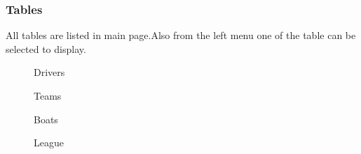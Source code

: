 \documentclass[a4paper,10pt,english]{sphinxmanual}
\begin{document}
\subsubsection{Tables}
\label{user/member2:tables}\begin{description}
\item[{All tables are listed in main page.Also from the left menu one of the table can be selected to display.}] \leavevmode
Drivers


Teams


Boats


League


\end{description}
\end{document}
